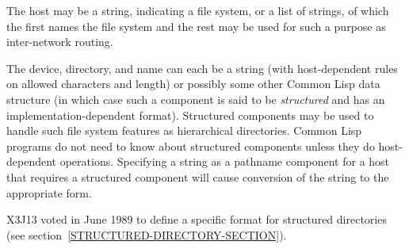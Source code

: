 The host may be a string, indicating a file system, or a list
of strings, of which the first names the file system and the rest
may be used for such a purpose as inter-network routing.

\begin{obsolete}
The device, directory, and name can each be a string (with
host-dependent rules on allowed characters and length) or possibly
some other Common Lisp data structure
(in which case such a component is said to be {\it structured}
and has an implementation-dependent format).
Structured components may be used to handle such file system features as
hierarchical directories.  Common Lisp programs do not need to know about
structured components unless they do host-dependent operations.
Specifying a string as a pathname component for a host that requires a
structured component will cause conversion of the string to the appropriate
form.
\end{obsolete}

\begin{newer}
X3J13 voted in June 1989 
to define a specific format for structured directories
(see section~\ref{STRUCTURED-DIRECTORY-SECTION}).
\end{newer}

